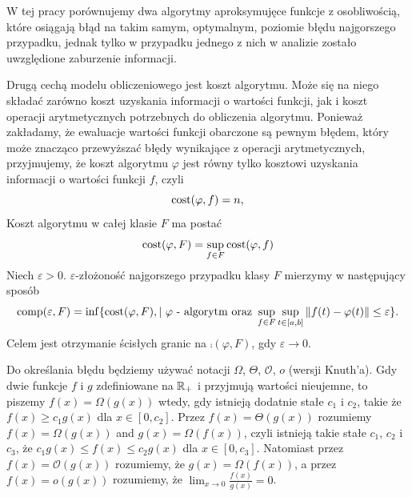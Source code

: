 \documentclass[oik, pdftex, man]{mgrwms}
\begin{document}
    W tej pracy porównujemy dwa algorytmy aproksymujęce funkcje z osobliwością, które osiągają błąd na takim samym, optymalnym, poziomie błędu najgorszego przypadku, jednak tylko w przypadku jednego z nich w analizie zostało uwzględione zaburzenie informacji.

    Drugą cechą modelu obliczeniowego jest koszt algorytmu. Może się na niego składać zarówno koszt uzyskania informacji o wartości funkcji, jak i koszt operacji arytmetycznych potrzebnych do obliczenia algorytmu. Ponieważ zakładamy, że ewaluacje wartości funkcji obarczone są pewnym błędem, który może znacząco przewyższać błędy wynikające z operacji arytmetycznych, przyjmujemy, że koszt algorytmu $\varphi$ jest równy tylko kosztowi uzyskania informacji o wartości funkcji $f$, czyli
    \begin{equation*}
        \mathrm{cost}(\varphi, f) = n,
    \end{equation*}
    Koszt algorytmu w całej klasie $F$ ma postać
    \begin{equation*}
        \mathrm{cost}(\varphi, F) = \sup_{f \in F} \mathrm{cost}(\varphi, f)
    \end{equation*}
    Niech $\varepsilon > 0$. $\varepsilon$-złożoność najgorszego przypadku klasy $F$ mierzymy w następujący sposób
    \begin{equation*}
        \mathrm{comp}(\varepsilon, F) = \inf \{\mathrm{cost}(\varphi, F), | \text{ $\varphi$ - algorytm oraz } \sup_{f \in F} \sup_{t \in [a,b]} \|f(t) - \varphi(t)\| \leq \varepsilon\}.
    \end{equation*}
    Celem jest otrzymanie ścisłych granic na $\comp(\varphi, F)$, gdy $\varepsilon \rightarrow 0$.

    Do określania błędu będziemy używać notacji $\varOmega$, $\varTheta$, $\mathcal{O}$, $\textit{o}$ (wersji Knuth'a). Gdy dwie funkcje $f$ i $g$ zdefiniowane na $\mathbb{R}_{+}$ i przyjmują wartości nieujemne, to piszemy $f(x) = \varOmega\left( g(x) \right)$ wtedy, gdy istnieją dodatnie stałe $c_{1}$ i $c_{2}$, takie że $f(x) \geq c_{1} g(x)$ dla $x \in [0, c_{2}]$. Przez $f(x) = \varTheta\left( g(x) \right)$ rozumiemy $f(x) = \varOmega\left( g(x) \right)$ and $g(x) = \varOmega\left( f(x) \right)$, czyli istnieją takie stałe $c_{1}$, $c_{2}$ i $c_{3}$, że $c_{1} g(x) \leq f(x) \leq c_{2} g(x)$ dla $x \in [0, c_{3}]$. Natomiast przez $f(x) = \mathcal{O}(g(x))$ rozumiemy, że $g(x) = \varOmega(f(x))$, a przez $f(x) = \textit{o}(g(x))$ rozumiemy, że $\displaystyle \lim_{x \rightarrow 0} \frac{f(x)}{g(x)} = 0$.
\end{document}
